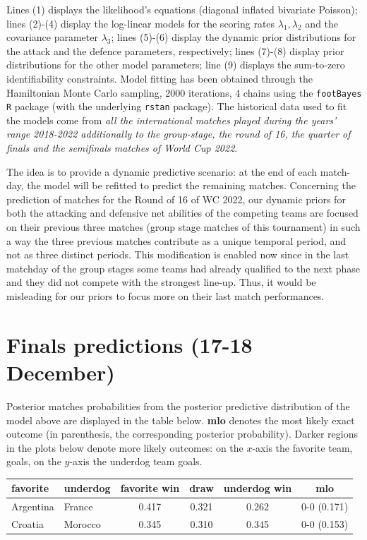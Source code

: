 \documentclass[
  10pt,
]{article}
\begin{document}
Lines (1) displays the likelihood's equations (diagonal inflated
bivariate Poisson); lines (2)-(4) display the log-linear models for the
scoring rates \(\lambda_{1}, \lambda_{2}\) and the covariance parameter
\(\lambda_3\); lines (5)-(6) display the dynamic prior distributions for
the attack and the defence parameters, respectively; lines (7)-(8)
display prior distributions for the other model parameters; line (9)
displays the sum-to-zero identifiability constraints. Model fitting has
been obtained through the Hamiltonian Monte Carlo sampling, 2000
iterations, 4 chains using the \texttt{footBayes} \texttt{R} package
(with the underlying \texttt{rstan} package). The historical data used
to fit the models come from \emph{all the international matches played
during the years' range 2018-2022 additionally to the group-stage, the
round of 16, the quarter of finals and the semifinals matches of World
Cup 2022}.

The idea is to provide a dynamic predictive scenario: at the end of each
match-day, the model will be refitted to predict the remaining matches.
Concerning the prediction of matches for the Round of 16 of WC 2022, our
dynamic priors for both the attacking and defensive net abilities of the
competing teams are focused on their previous three matches (group stage
matches of this tournament) in such a way the three previous matches
contribute as a unique temporal period, and not as three distinct
periods. This modification is enabled now since in the last matchday of
the group stages some teams had already qualified to the next phase and
they did not compete with the strongest line-up. Thus, it would be
misleading for our priors to focus more on their last match
performances.

\hypertarget{finals-predictions-17-18-december}{%
\section{Finals predictions (17-18
December)}\label{finals-predictions-17-18-december}}

Posterior matches probabilities from the posterior predictive
distribution of the model above are displayed in the table below.
\textbf{mlo} denotes the most likely exact outcome (in parenthesis, the
corresponding posterior probability). Darker regions in the plots below
denote more likely outcomes: on the \(x\)-axis the favorite team, goals, on the
\(y\)-axis the underdog team goals.

\begin{longtable}[]{@{}llcccc@{}}
\toprule
favorite & underdog & favorite win & draw & underdog win & mlo \\
\midrule
\endhead
Argentina & France & 0.417 & 0.321 & 0.262 & 0-0 (0.171) \\
Croatia & Morocco & 0.345 & 0.310 & 0.345 & 0-0 (0.153) \\
\bottomrule
\end{longtable}
\end{document}
